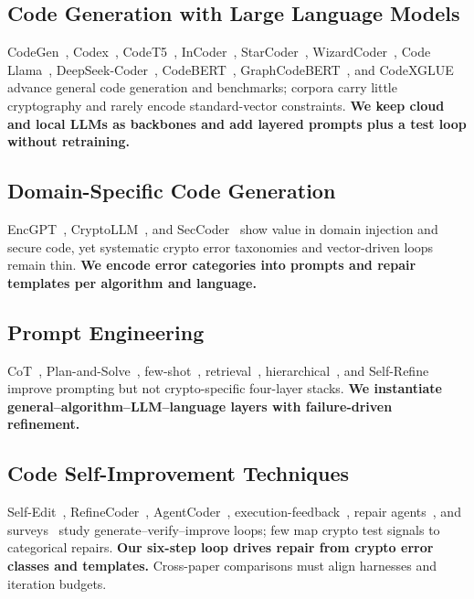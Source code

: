 \documentclass[12pt]{llncs}
\begin{document}
\subsection{Code Generation with Large Language Models}
CodeGen~\cite{codegen1,codegen2}, Codex~\cite{codex}, CodeT5~\cite{codet5,codet5plus}, InCoder~\cite{incoder}, StarCoder~\cite{starcoder}, WizardCoder~\cite{wizardcoder}, Code Llama~\cite{codellama}, DeepSeek-Coder~\cite{deepseekcoder}, CodeBERT~\cite{codebert}, GraphCodeBERT~\cite{graphcodebert}, and CodeXGLUE~\cite{codexglue} advance general code generation and benchmarks; corpora carry little cryptography and rarely encode standard-vector constraints. \textbf{We keep cloud and local LLMs as backbones and add layered prompts plus a test loop without retraining.}

\subsection{Domain-Specific Code Generation}
EncGPT~\cite{encgpt}, CryptoLLM~\cite{cryptollm}, and SecCoder~\cite{seccoder} show value in domain injection and secure code, yet systematic crypto error taxonomies and vector-driven loops remain thin. \textbf{We encode error categories into prompts and repair templates per algorithm and language.}

\subsection{Prompt Engineering}
CoT~\cite{cot,zeroshotcot}, Plan-and-Solve~\cite{planandsolve}, few-shot~\cite{fewshot,progsynprompt}, retrieval~\cite{coderagbench,repolevelprompt}, hierarchical~\cite{hierprompt}, and Self-Refine~\cite{selfrefine} improve prompting but not crypto-specific four-layer stacks. \textbf{We instantiate general--algorithm--LLM--language layers with failure-driven refinement.}

\subsection{Code Self-Improvement Techniques}
Self-Edit~\cite{selfedit}, RefineCoder~\cite{refinecoder}, AgentCoder~\cite{agentcoder}, execution-feedback~\cite{cycle,rlef}, repair agents~\cite{repairagent,recode}, and surveys~\cite{secsurvey,securecodegen} study generate--verify--improve loops; few map crypto test signals to categorical repairs. \textbf{Our six-step loop drives repair from crypto error classes and templates.} Cross-paper comparisons must align harnesses and iteration budgets.
\end{document}
